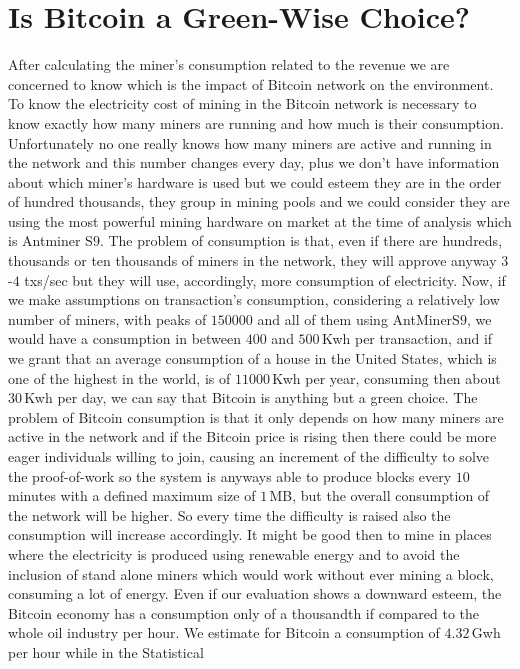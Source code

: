\documentclass[USenglish]{uit-thesis}
\begin{document}
\section{Is Bitcoin a Green-Wise Choice?}
After calculating the miner's consumption related
to the revenue we are concerned to know
which is the impact of Bitcoin network on the environment.
To know the electricity cost of mining in the Bitcoin
network is necessary to know exactly how many
miners are running and how much is their
consumption. Unfortunately
no one really knows how many
miners are active and running in the network
and this number changes every day, plus we don't
have information about which miner's hardware is
used but we could esteem
they are in the order of hundred thousands, they group in
mining pools and we could consider they are using
the most powerful mining hardware on market
at the time of analysis which is Antminer S$9$.
The problem of consumption
is that, even if there are hundreds, thousands or ten
thousands of miners in the network, they will approve
anyway $3$-$4$ txs/sec but they will use, accordingly,
more consumption of electricity.
Now, if we make assumptions on transaction's consumption,
considering a relatively low number of miners, with peaks
of $150000$ and all of them using AntMinerS$9$,
we would have a consumption in between $400$ and
$500$\,Kwh per transaction, and if we grant that an
average consumption of a house in the United States,
which is one of the highest in the world, is of
$11000$\,Kwh per year, consuming then about
$30$\,Kwh per day, we can say
that Bitcoin is anything
but a green choice.
The problem of Bitcoin consumption is that
it only depends on how many miners are
active in the network and if the Bitcoin price
is rising then there could be more eager
individuals willing to join, causing an increment
of the difficulty to solve the proof-of-work so
the system is anyways able to produce
blocks every $10$ minutes
with a defined maximum size of $1$\,MB,
but the overall consumption of the network
will be higher. So every time the difficulty
is raised also the consumption will increase
accordingly.
It might be good then to mine in places
where the electricity is produced using
renewable energy and to avoid
the inclusion of stand alone
miners which would work without
ever mining a block, consuming a lot of energy.
Even if our evaluation shows a downward esteem,
the Bitcoin economy has a consumption
only of a thousandth if compared to the
whole oil industry per hour.
We estimate for Bitcoin a consumption
of $4.32$\,Gwh per hour while in the Statistical
\end{document}
